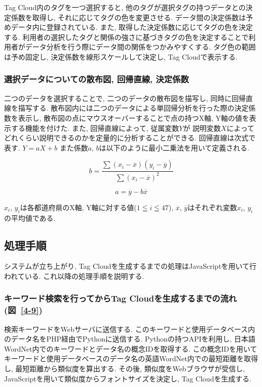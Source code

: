 \documentclass[sotsuron]{kuee}
\begin{document}
Tag Cloud内のタグを一つ選択すると, 他のタグが選択タグの持つデータとの決定係数を取得し, それに応じてタグの色を変更させる.
データ間の決定係数は予めデータ内に登録されている. また, 取得した決定係数に応じてタグの色を決定する.
利用者の選択したタグと関係の強さに基づきタグの色を決定することで利用者がデータ分析を行う際にデータ間の関係をつかみやすくする.
タグ色の範囲は予め固定し, 決定係数を線形スケールして決定し, Tag Cloudで表示する.

\subsubsection{選択データについての散布図, 回帰直線, 決定係数}

二つのデータを選択することで, 二つのデータの散布図を描写し, 同時に回帰直線を描写する.
散布図内には二つのデータによる単回帰分析を行った際の決定係数を表示し, 散布図の点にマウスオーバーすることで点の持つX軸, Y軸の値を表示する機能を付けた.
また, 回帰直線によって,
従属変数$Y$が
説明変数$X$によってどれくらい説明できるのかを定量的に分析することができる. 回帰直線は次式で表す.
$Y = aX + b$
また係数$a$, $b$は以下のように最小二乗法を用いて定義される.

   \begin{equation}
	b = \frac{\sum (x_{i} - \overline{x})(y_{i} - \overline{y})}{\sum (x_{i} - \overline{x})^2}
   \end{equation}

   \begin{equation}
	a = \overline{y} - b\overline{x}
   \end{equation}

$x_{i}$, $y_{i}$は各都道府県のX軸, Y軸に対する値($1 ≦ i ≦ 47$),
$\overline{x}$, $\overline{y}$はそれぞれ変数$x_{i}$, $y_{i}$の平均値である.


\subsection{処理手順}

システムが立ち上がり, Tag Cloudを生成するまでの処理はJavaScriptを用いて行われている. これ以降の処理手順を説明する.

\subsubsection{キーワード検索を行ってからTag Cloudを生成するまでの流れ(図~\ref{4-9})}

検索キーワードをWebサーバに送信する. このキーワードと使用データベース内のデータ名をPHP経由でPythonに送信する.
Pythonの持つAPIを利用し, 日本語WordNet内でのキーワードとデータ名の概念IDを取得する.
この概念IDを用いてキーワードと使用データベースのデータ名の英語WordNet内での最短距離を取得し, 最短距離から類似度を算出する.
その後, 類似度をWebブラウザが受信し, JavaScriptを用いて類似度からフォントサイズを決定し, Tag Cloudを生成する.
\end{document}
